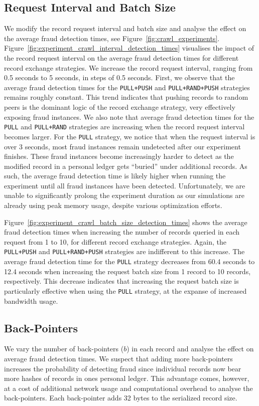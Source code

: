 \subsection{Request Interval and Batch Size}
We modify the record request interval and batch size and analyse the effect on the average fraud detection times, see Figure~\ref{fig:crawl_experiments}.
Figure~\ref{fig:experiment_crawl_interval_detection_times} visualises the impact of the record request interval on the average fraud detection times for different record exchange strategies.
We increase the record request interval, ranging from 0.5 seconds to 5 seconds, in steps of 0.5 seconds.
First, we observe that the average fraud detection times for the \texttt{PULL+PUSH} and \texttt{PULL+RAND+PUSH} strategies remains roughly constant.
This trend indicates that pushing records to random peers is the dominant logic of the record exchange strategy, very effectively exposing fraud instances.
We also note that average fraud detection times for the \texttt{PULL} and \texttt{PULL+RAND} strategies are increasing when the record request interval becomes larger.
For the \texttt{PULL} strategy, we notice that when the request interval is over 3 seconds, most fraud instances remain undetected after our experiment finishes.
These fraud instances become increasingly harder to detect as the modified record in a personal ledger gets \enquote{buried} under additional records.
As such, the average fraud detection time is likely higher when running the experiment until all fraud instances have been detected.
Unfortunately, we are unable to significantly prolong the experiment duration as our simulations are already using peak memory usage, despite various optimization efforts.

Figure~\ref{fig:experiment_crawl_batch_size_detection_times} shows the average fraud detection times when increasing the number of records queried in each request from 1 to 10, for different record exchange strategies.
Again, the \texttt{PULL+PUSH} and \texttt{PULL+RAND+PUSH} strategies are indifferent to this increase.
The average fraud detection time for the \texttt{PULL} strategy decreases from 60.4 seconds to 12.4 seconds when increasing the request batch size from 1 record to 10 records, respectively.
This decrease indicates that increasing the request batch size is particularly effective when using the \texttt{PULL} strategy, at the expanse of increased bandwidth usage.

\subsection{Back-Pointers}
We vary the number of back-pointers ($ b $) in each record and analyse the effect on average fraud detection times.
We suspect that adding more back-pointers increases the probability of detecting fraud since individual records now bear more hashes of records in ones personal ledger.
This advantage comes, however, at a cost of additional network usage and computational overhead to analyse the back-pointers.
Each back-pointer adds 32 bytes to the serialized record size.

